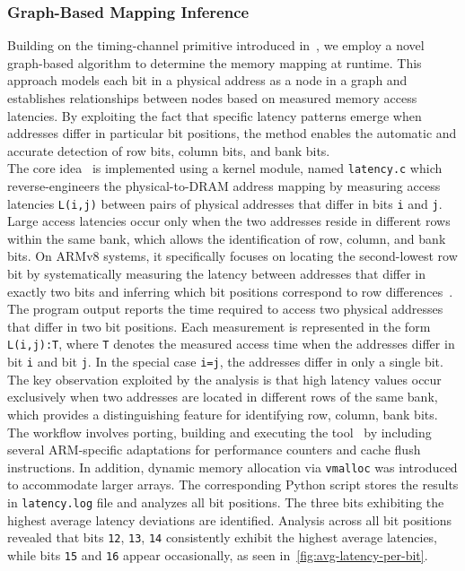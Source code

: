     \subsubsection{Graph-Based Mapping Inference} \label{subsubsec:graph-based-mapping-inference}
        Building on the timing-channel primitive introduced in~\cite{paperOneBitFlipsOneCouldFlops}, we employ a novel 
        graph-based algorithm to determine the memory mapping at runtime. 
        This approach models each bit in a physical address as a node in a graph and establishes 
        relationships between nodes based on measured memory access latencies. By exploiting the fact 
        that specific latency patterns emerge when addresses differ in particular bit positions, the method 
        enables the automatic and accurate detection of row bits, column bits, and bank bits.
        \\
        The core idea~\cite{toolRowhammer-armv8} is implemented using a kernel module, named \texttt{latency.c} which reverse-engineers the physical-to-DRAM 
        address mapping by measuring access latencies \texttt{L(i,j)} between pairs of physical addresses that differ 
        in bits \texttt{i} and \texttt{j}. Large access latencies occur only when the two addresses reside in different rows 
        within the same bank, which allows the identification of row, column, and bank bits. On ARMv8 systems, 
        it specifically focuses on locating the second-lowest row bit by systematically measuring the 
        latency between addresses that differ in exactly two bits and inferring which bit positions correspond 
        to row differences~\cite{toolRowhammer-armv8}.
        \\
        The program output reports the time required to access two physical addresses that differ in two 
        bit positions. Each measurement is represented in the form \texttt{L(i,j):T}, where \texttt{T} denotes the measured 
        access time when the addresses differ in bit \texttt{i} and bit \texttt{j}. In the special case \texttt{i=j}, the addresses 
        differ in only a single bit. The key observation exploited by the analysis is that high latency 
        values occur exclusively when two addresses are located in different rows of the same bank, which 
        provides a distinguishing feature for identifying row, column, bank bits.
        \\
        The workflow involves porting, building and executing the tool~\cite{toolRowhammer-armv8} by including several ARM-specific
        adaptations for performance counters and cache flush instructions. In addition, dynamic memory allocation 
        via \texttt{vmalloc} was introduced to accommodate larger arrays. The corresponding Python script stores the results in
        \texttt{latency.log} file and analyzes all bit positions. 
        The three bits exhibiting the highest average latency deviations are identified. 
        Analysis across all bit positions revealed that bits \texttt{12}, \texttt{13}, \texttt{14} 
        consistently exhibit the highest average latencies, while bits \texttt{15} and \texttt{16} appear occasionally,
        as seen in~\cref{fig:avg-latency-per-bit}.


